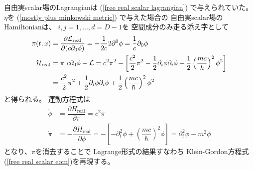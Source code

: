 自由実scalar場のLagrangianは
(\ref{free real scalar lagrangian})
で与えられていた。
$\eta$を
(\ref{mostly plus minkowski metric})
で与えた場合の
自由実scalar場のHamiltonianは、
$i, j = 1, \dots, d = D-1$を
空間成分のみ走る添え字として
\begin{subequations}
\begin{align}
	\pi(t, x)
&=
	\dfrac{ \partial \mathcal{L}_{\text{real}} }
		{ \partial( c \partial_0 \phi) }
=
	- \dfrac{1}{2 c}
		2 \partial^0 \phi
=   \dfrac{1}{c}
	\partial_0 \phi
\\
	\mathcal{H}_{\text{real}}
&=
	\pi\ c \partial_0 \phi
	-
	\mathcal{L}
= c^2 \pi^2
	- \left[
		\dfrac{ c^2 }{2} \pi^2
	- \dfrac{ 1 }{2}
			\partial_i \phi
			\partial_i \phi
	- \dfrac{1}{2}
		\left(
			\dfrac{m c}{\hbar}
		\right)^2 \phi^2
	\right]
\notag\\&
= \dfrac{ c^2 }{2} \pi^2
	+ \dfrac{ 1 }{2}
		\partial_i \phi
		\partial_i \phi
	+	\dfrac{1}{2}
		\left(
			\dfrac{m c}{\hbar}
		\right)^2
		\phi^2
\end{align}
\end{subequations}
と得られる。
運動方程式は
\begin{subequations}
\begin{align}
	\dot{\phi}
&=
	\dfrac{
		\partial H_{\text{real}}
	}{ \partial \pi}
=
	c^2 \pi
\\
	\dot{\pi}
&=
	- \dfrac{
		\partial H_{\text{real}}
	}{ \partial \phi}
=
	- \left[
	- \partial_i^2 \phi
	+ \left(
			\dfrac{m c}{\hbar}
		\right)^2 \phi
	\right]
= \partial_i^2 \phi
	- m^2 \phi
\end{align}
\end{subequations}
となり、$\pi$を消去することで
Lagrange形式の結果すなわち
Klein-Gordon方程式
(\ref{free real scalar eom})を再現する。

